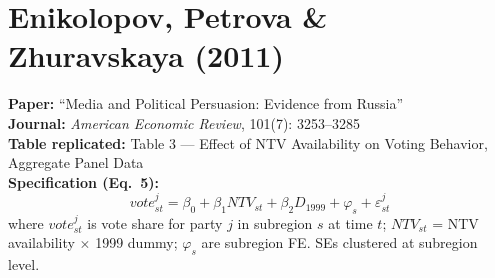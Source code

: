 \documentclass[11pt,a4paper]{article}
\begin{document}
\section{Enikolopov, Petrova \& Zhuravskaya (2011)}

\textbf{Paper:} ``Media and Political Persuasion: Evidence from Russia''\\
\textbf{Journal:} \textit{American Economic Review}, 101(7): 3253--3285\\
\textbf{Table replicated:} Table 3 --- Effect of NTV Availability on Voting Behavior, Aggregate Panel Data\\
\textbf{Specification (Eq.\ 5):}
\[
vote^j_{st} = \beta_0 + \beta_1 NTV_{st} + \beta_2 D_{1999} + \varphi_s + \varepsilon^j_{st}
\]
where $vote^j_{st}$ is vote share for party $j$ in subregion $s$ at time $t$; $NTV_{st}$ = NTV availability $\times$ 1999 dummy; $\varphi_s$ are subregion FE. SEs clustered at subregion level.

\vspace{0.3cm}
\noindent{}
\end{document}
